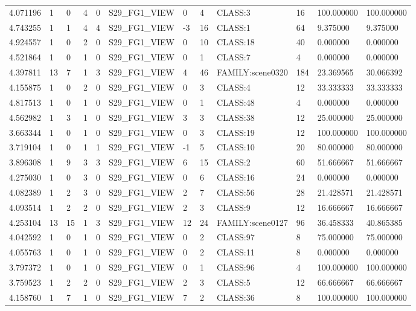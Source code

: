 \begin{tabular}{llllllllllll}
4.071196 & 1 & 0 & 4 & 0 & S29\_FG1\_VIEW & 0 & 4 & CLASS:3 & 16 & 100.000000 & 100.000000 \\
4.743255 & 1 & 1 & 4 & 4 & S29\_FG1\_VIEW & -3 & 16 & CLASS:1 & 64 & 9.375000 & 9.375000 \\
4.924557 & 1 & 0 & 2 & 0 & S29\_FG1\_VIEW & 0 & 10 & CLASS:18 & 40 & 0.000000 & 0.000000 \\
4.521864 & 1 & 0 & 1 & 0 & S29\_FG1\_VIEW & 0 & 1 & CLASS:7 & 4 & 0.000000 & 0.000000 \\
4.397811 & 13 & 7 & 1 & 3 & S29\_FG1\_VIEW & 4 & 46 & FAMILY:scene0320 & 184 & 23.369565 & 30.066392 \\
4.155875 & 1 & 0 & 2 & 0 & S29\_FG1\_VIEW & 0 & 3 & CLASS:4 & 12 & 33.333333 & 33.333333 \\
4.817513 & 1 & 0 & 1 & 0 & S29\_FG1\_VIEW & 0 & 1 & CLASS:48 & 4 & 0.000000 & 0.000000 \\
4.562982 & 1 & 3 & 1 & 0 & S29\_FG1\_VIEW & 3 & 3 & CLASS:38 & 12 & 25.000000 & 25.000000 \\
3.663344 & 1 & 0 & 1 & 0 & S29\_FG1\_VIEW & 0 & 3 & CLASS:19 & 12 & 100.000000 & 100.000000 \\
3.719104 & 1 & 0 & 1 & 1 & S29\_FG1\_VIEW & -1 & 5 & CLASS:10 & 20 & 80.000000 & 80.000000 \\
3.896308 & 1 & 9 & 3 & 3 & S29\_FG1\_VIEW & 6 & 15 & CLASS:2 & 60 & 51.666667 & 51.666667 \\
4.275030 & 1 & 0 & 3 & 0 & S29\_FG1\_VIEW & 0 & 6 & CLASS:16 & 24 & 0.000000 & 0.000000 \\
4.082389 & 1 & 2 & 3 & 0 & S29\_FG1\_VIEW & 2 & 7 & CLASS:56 & 28 & 21.428571 & 21.428571 \\
4.093514 & 1 & 2 & 2 & 0 & S29\_FG1\_VIEW & 2 & 3 & CLASS:9 & 12 & 16.666667 & 16.666667 \\
4.253104 & 13 & 15 & 1 & 3 & S29\_FG1\_VIEW & 12 & 24 & FAMILY:scene0127 & 96 & 36.458333 & 40.865385 \\
4.042592 & 1 & 0 & 1 & 0 & S29\_FG1\_VIEW & 0 & 2 & CLASS:97 & 8 & 75.000000 & 75.000000 \\
4.055763 & 1 & 0 & 1 & 0 & S29\_FG1\_VIEW & 0 & 2 & CLASS:11 & 8 & 0.000000 & 0.000000 \\
3.797372 & 1 & 0 & 1 & 0 & S29\_FG1\_VIEW & 0 & 1 & CLASS:96 & 4 & 100.000000 & 100.000000 \\
3.759523 & 1 & 2 & 2 & 0 & S29\_FG1\_VIEW & 2 & 3 & CLASS:5 & 12 & 66.666667 & 66.666667 \\
4.158760 & 1 & 7 & 1 & 0 & S29\_FG1\_VIEW & 7 & 2 & CLASS:36 & 8 & 100.000000 & 100.000000 \\

\end{tabular}
